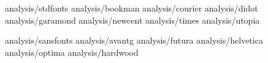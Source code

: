 \documentclass[twocolumn]{article}
\def\inputsect#1{\let\sectionname#1}
\begin{document}
\inputsect\section analysis/stdfonts
\inputsect\subsection analysis/bookman
\inputsect\subsection analysis/courier
\inputsect\subsection analysis/didot
\inputsect\subsection analysis/garamond
\inputsect\subsection analysis/newcent
\inputsect\subsection analysis/times
\inputsect\subsection analysis/utopia

\inputsect\section analysis/sansfonts
\inputsect\subsection analysis/avantg
\inputsect\subsection analysis/futura
\inputsect\subsection analysis/helvetica
\inputsect\subsection analysis/optima
\inputsect\subsection analysis/hardwood
\end{document}

